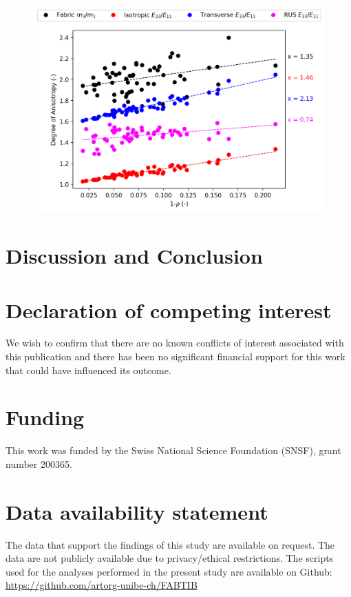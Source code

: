 \documentclass[a4paper,fleqn]{DC_ArtStyle}
\begin{document}
	\begin{figure}
		\includegraphics[width=\linewidth]{AnisotropyBVTV}
	\end{figure}
	
	
	\section{Discussion and Conclusion}
	
	
	\section*{Declaration of competing interest}
	We wish to confirm that there are no known conflicts of interest associated with this publication and there has been no significant financial support for this work that could have influenced its outcome.
	
	\section*{Funding}
	This work was funded by the Swiss National Science Foundation (SNSF), grant number 200365.

	\section*{Data availability statement}
	The data that support the findings of this study are available on request. The data are not publicly available due to privacy/ethical restrictions. The scripts used for the analyses performed in the present study are available on Github: \url{https://github.com/artorg-unibe-ch/FABTIB}
	
\end{document}
